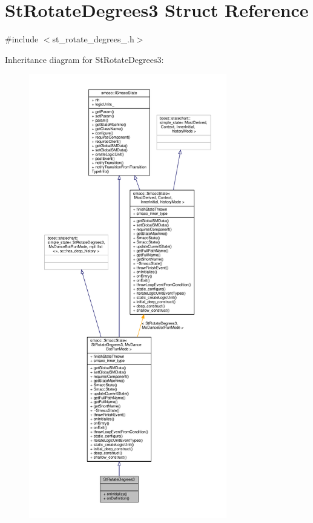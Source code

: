 \hypertarget{structStRotateDegrees3}{}\section{St\+Rotate\+Degrees3 Struct Reference}
\label{structStRotateDegrees3}


{\ttfamily \#include $<$st\+\_\+rotate\+\_\+degrees\+\_.\+h$>$}



Inheritance diagram for St\+Rotate\+Degrees3\+:
\nopagebreak
\begin{figure}[H]
\begin{center}
\leavevmode
\includegraphics[height=550pt]{structStRotateDegrees3__inherit__graph}
\end{center}
\end{figure}


